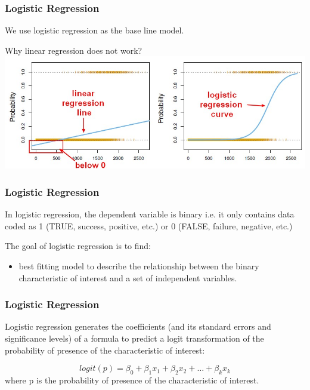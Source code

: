 \documentclass{beamer}
\begin{document}
\begin{frame}
\frametitle{Logistic Regression}
We use logistic regression as the base line model.

Why linear regression does not work?
\includegraphics[scale=0.345]{pic/logistic_regression_vs_linear.jpg}
\end{frame}

\begin{frame}
    \frametitle{Logistic Regression}

In logistic regression, the dependent variable is binary i.e. it only 
contains data coded as 1 (TRUE, success, positive, etc.) or 0 (FALSE, 
failure, negative, etc.)

The goal of logistic regression is to find:

\begin{itemize}
\item best fitting  model to describe the relationship between the 
binary characteristic of interest and a set of independent variables. 
\end{itemize}

\end{frame}


\begin{frame}
    \frametitle{Logistic Regression}
Logistic regression generates the coefficients (and its standard 
errors and significance levels) of a formula to predict a logit 
transformation of the probability of presence of the characteristic 
of interest:
 
 \begin{equation}
	logit(p)=\beta_0+\beta_1 x_1+\beta_2 x_2 +\ldots+\beta_k x_k
\end{equation}
where p is the probability of presence of the characteristic of 
interest.

\end{frame}
\end{document}
